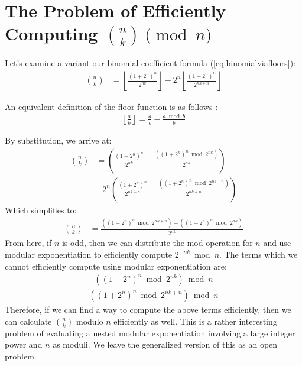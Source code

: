 \documentclass{article}
\theoremstyle{plain}
\theoremstyle{definition}
\begin{document}
\section[The Problem of Efficiently Computing n choose k Modulo n]{The Problem of Efficiently Computing \( \binom{n}{k} \pmod{n} \)}

Let's examine a variant our binomial coefficient formula (\ref{eq:binomialviafloors}):
\begin{align*}
    \binom{n}{k} &= \left\lfloor\frac{(1 + 2^{n})^{n}}{2^{n k}}\right\rfloor - 2^{n} \left\lfloor \frac{(1 + 2^{n})^{n}}{2^{n k + n}} \right\rfloor
\end{align*}

An equivalent definition of the floor function is as follows \cite{niven2008introduction}:
\begin{align}
    \left\lfloor \frac{a}{b} \right\rfloor = \frac{a}{b} - \frac{a \bmod{b}}{b}
\end{align}

By substitution, we arrive at:
\begin{align*}
    \binom{n}{k} &= \left(\frac{(1 + 2^{n})^{n}}{2^{nk}} - \frac{((1 + 2^{n})^{n} \bmod{2^{nk}})}{2^{nk}}\right)\\&- 2^{n} \left( \frac{(1 + 2^{n})^{n}}{2^{nk+n}} - \frac{((1 + 2^{n})^{n} \bmod{2^{nk+n}})}{2^{nk+n}} \right)
\end{align*}
Which simplifies to:
\begin{align*}
    \binom{n}{k} &= \frac{((1 + 2^{n})^{n} \bmod{2^{nk+n}}) - ((1 + 2^{n})^{n} \bmod{2^{nk}})}{2^{nk}}
\end{align*}
From here, if $n$ is odd, then we can distribute the mod operation for $n$ and use modular exponentiation to efficiently compute $2^{-nk} \bmod{n}$. The terms which we cannot efficiently compute using modular exponentiation are:
\begin{align}
    \left((1 + 2^{n})^{n} \bmod{2^{nk}}\right) \bmod{n}
\end{align}
\begin{align}
    \left((1 + 2^{n})^{n} \bmod{2^{nk+n}}\right) \bmod{n}
\end{align}
Therefore, if we can find a way to compute the above terms efficiently, then we can calculate \( \binom{n}{k} \) modulo \( n \) efficiently as well. This is a rather interesting problem of evaluating a nested modular exponentiation involving a large integer power and \( n \) as moduli. We leave the generalized version of this as an open problem.
\end{document}
